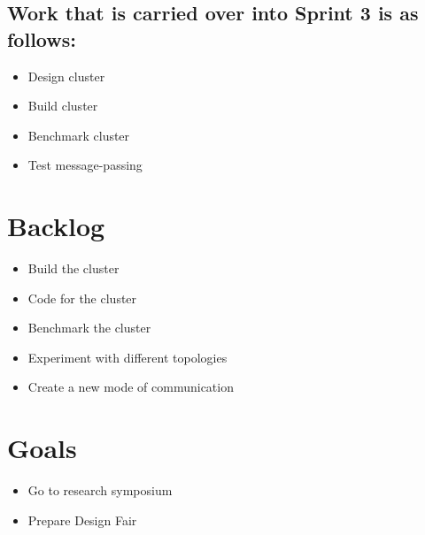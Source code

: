 \documentclass{article}
\begin{document}
\subsection*{Work that is carried over into Sprint 3 is as follows:}
\begin{itemize}
	\item Design cluster
	\item Build cluster
	\item Benchmark cluster
	\item Test message-passing
\end{itemize}

\section*{Backlog}
\begin{itemize}
	\item Build the cluster
	\item Code for the cluster
	\item Benchmark the cluster
	\item Experiment with different topologies
	\item Create a new mode of communication
\end{itemize}

\section*{Goals}
\begin{itemize}
	\item Go to research symposium
	\item Prepare Design Fair
\end{itemize}
\end{document}
